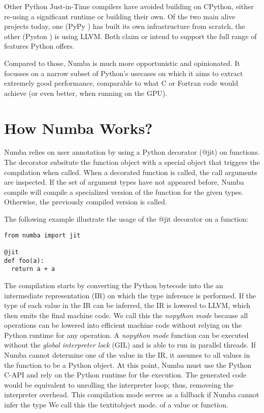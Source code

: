 \documentclass{acm_proc_article-sp}
\begin{document}
Other Python Just-in-Time compilers have avoided building on CPython,
either re-using a significant runtime or building their own.  Of the
two main alive projects today, one (PyPy \cite{pypy:pypy}) has built its
own infrastructure from scratch, the other (Pyston \cite{github:pyston})
is using LLVM.  Both claim or intend to support the full range of features
Python offers.

Compared to those, Numba is much more opportunistic and opinionated.
It focusses on a narrow subset of Python's usecases on which it
aims to extract extremely good performance, comparable to what C or Fortran
code would achieve (or even better, when running on the GPU).


\section{How Numba Works?}

Numba relies on user annotation by using a Python decorator (@jit) on functions.
The decorator subsitute the function object with a special object that triggers
the compilation when called. When a decorated function is called,
the call arguments are inspected. If the set of argument types have not appeared
before, Numba compile will compile a specialized version of the function for the
given types. Otherwise, the previously compiled version is called.

The following example illustrate the usage of the @jit decorator on a function:


\begin{lstlisting}
from numba import jit

@jit
def foo(a):
  return a + a
\end{lstlisting}

The compilation starts by converting the Python bytecode into the an
intermediate representation (IR) on which the type inference
is performed. If the type of each value in the IR can be inferred, the IR is
lowered to LLVM, which then emits the final machine code.  We call this the
\textit{nopython mode} because all operations can be lowered into efficient
machine code without relying on the Python runtime for any operation.
A \textit{nopython mode} function can be executed without the \textit{global
interpreter lock} (GIL) and is able to run in parallel threads.
If Numba cannot determine one of the value in the IR,
it assumes to all values in the function to be a Python object. At this point,
Numba must use the Python C-API and rely on the Python runtime for the
execution. The generated code would be equivalent to unrolling the interpreter
loop; thus, removeing the interpreter overhead.
This compilation mode serves as a fallback if Numba cannot infer the type
We call this the textit{object mode}.
of a value or function.
\end{document}
